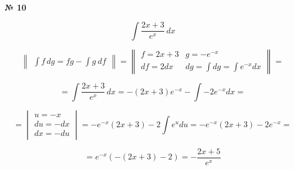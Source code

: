 \documentclass{article}
\begin{document}
\textbf{№ 10} 

\begingroup

\Large

$$ \int \frac{2x+3}{e^x} \,dx $$

$$ \begin{Vmatrix} \int f \,dg = fg - \int g \ df \end{Vmatrix} =
   \begin{Vmatrix} f = 2x+3 &  g = -e^{-x} \\
                  df = 2dx  & dg = \int dg = \int e^{-x} dx \end{Vmatrix} = $$

$$ = \int \frac{2x+3}{e^x} \,dx = -(2x+3)e^{-x} - \int -2 e^{-x}dx = $$

$$ = \begin{vmatrix} u = -x \\ 
                    du = -dx \\
                    dx = - du \end{vmatrix} 
= -e^{-x}(2x+3) -2 \int e^{u}du 
= -e^{-x}(2x+3) -2e^{-x}
= $$

$$ = e^{-x}(-(2x+3)-2)
= -\frac{2x+5}{e^{x}} $$

\endgroup
\end{document}
